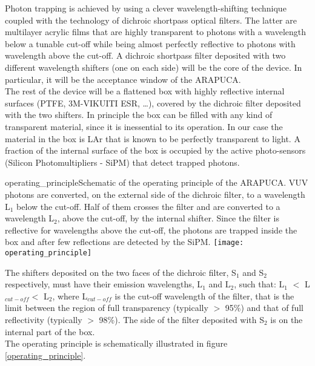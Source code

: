 Photon trapping is achieved by using a clever wavelength-shifting technique coupled with the technology of dichroic shortpass optical filters. The latter are multilayer acrylic films that are
highly transparent to photons with a wavelength below a tunable cut-off while being almost perfectly reflective to photons with wavelength above the cut-off. 
A dichroic shortpass filter deposited with two different wavelength shifters (one on each side) will be the core of the device. In particular, it will be the acceptance window of the 
ARAPUCA.\\
The rest of the device will be a flattened box with highly reflective internal surfaces (PTFE, 3M-VIKUITI ESR, \dots), covered by the 
dichroic filter deposited with the two shifters. In principle the box can be filled with any kind of transparent material, since it is inessential to its operation. In our case the material in the 
box is LAr that is known to be perfectly transparent to light.
A fraction of the internal surface of the box is occupied by the active photo-sensors (Silicon Photomultipliers - SiPM) that detect trapped photons.\\

\begin{cdrfigure}{operating_principle}{Schematic of the operating principle of the ARAPUCA. VUV photons are converted, on the external side of the dichroic filter, to a wavelength L$_1$ below the cut-off. Half of 
them crosses the filter and are converted to a wavelength L$_2$, above the cut-off, by the internal shifter. Since the filter is reflective for wavelengths above the cut-off, the photons are 
trapped inside the box and after few reflections are detected by the SiPM.}
\texttt{[image: operating\_principle]}
\end{cdrfigure}

The shifters deposited on the two faces of the dichroic filter, S$_1$ and S$_2$ respectively, must have their emission wavelengths, L$_1$ and L$_2$, such that:  
L$_1$ $<$ L$_{cut-off}$$ <$ L$_2$, where L$_{cut-off}$ is the cut-off wavelength of the filter, that is the limit between the region of full transparency (typically $>$ 95\%) and that of full
 reflectivity (typically $>$ 98\%). The side of the filter deposited with S$_2$ is on the internal part of the box.\\
 The operating principle is schematically illustrated in figure \ref{operating_principle}.\\
 

